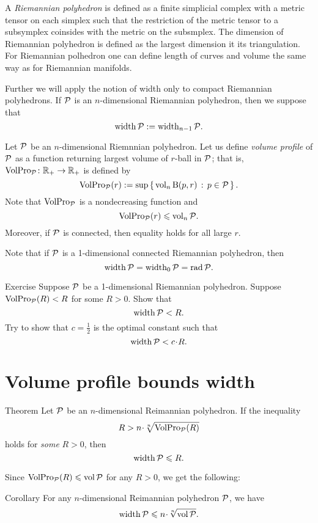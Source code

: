 A \emph{Riemannian polyhedron} is defined as a finite simplicial complex with a metric tensor on each simplex such that the restriction of the metric tensor to a subsymplex coinsides with the metric on the subsmplex.
The dimension of Riemannian polyhedron is defined as the largest dimension it its triangulation.
For Riemannian polhedron one can define length of curves and volume the same way as for Riemannian manifolds.

Further we will apply the notion of width only to compact Riemannian polyhedrons.
If $\mathcal{P}$ is an $n$-dimensional Riemannian polyhedron, then 
we suppose that
\[\operatorname{\rm width}\nolimits\mathcal{P}\mathrel{:=}\operatorname{\rm width}\nolimits_{n-1}\mathcal{P}.\]

Let $\mathcal{P}$ be an $n$-dimensional Riemnnian polyhedron.
Let us define \emph{volume profile} of $\mathcal{P}$ as a function 
returning largest volume of $r$-ball in $\mathcal{P}$;
that is, $\operatorname{\rm VolPro}\nolimits_{\mathcal{P}}\colon\mathbb{R}_+\to\mathbb{R}_+$ is defined by 
\[\operatorname{\rm VolPro}\nolimits_{\mathcal{P}}(r)\mathrel{:=} \sup\left\{\,{\operatorname{\rm vol}\nolimits_n \mathrm{B}{}(p,r)}\,:\,{p\in\mathcal{P}}\,\right\}.\]
Note that 
$\operatorname{\rm VolPro}\nolimits_{\mathcal{P}}$ is a nondecreasing function and
\[\operatorname{\rm VolPro}\nolimits_{\mathcal{P}}(r)\leqslant\operatorname{\rm vol}\nolimits_n\mathcal{P}.\]
Moreover, if $\mathcal{P}$ is connected, then equality holds
for all large $r$.

Note that if $\mathcal{P}$ is a 1-dimensional connected Riemannian polyhedron, then 
\[\operatorname{\rm width}\nolimits\mathcal{P}=\operatorname{\rm width}\nolimits_0\mathcal{P}=\mathop{\rm rad}\nolimits\mathcal{P}.\]

\begin{thm}{Exercise}\label{ex:1D-case}
Suppose $\mathcal{P}$ be a 1-dimensional Riemannian polyhedron.
Suppose $\operatorname{\rm VolPro}\nolimits_{\mathcal{P}}(R)<R$ for some $R>0$.
Show that 
\[\operatorname{\rm width}\nolimits \mathcal{P}<R.\]
Try to show that $c=\tfrac 12$ is the optimal constant such that 
\[\width \spc{P}<c\cdot R.\]
\end{thm}

\section{Volume profile bounds width}

\begin{thm}{Theorem}\label{thm:width<volpro}
Let $\mathcal{P}$ be an $n$-dimensional Reimannian polyhedron. 
If the inequality 
\[R> n\cdot \sqrt[n]{\VolPro_{\spc{P}}(R)}\]
holds for {}\emph{some} $R>0$, then 
\[\operatorname{\rm width}\nolimits\mathcal{P}\leqslant  R.\]
\end{thm}

Since $\operatorname{\rm VolPro}\nolimits_{\mathcal{P}}(R)\leqslant \operatorname{\rm vol}\nolimits\mathcal{P}$ for any $R>0$,
we get the following:

\begin{thm}{Corollary}\label{thm:width<vol}
For any $n$-dimensional Reimannian polyhedron $\mathcal{P}$, we have
\[\width\spc{P}\le n\cdot \sqrt[n]{\vol\spc{P}}.\]

\end{thm}

